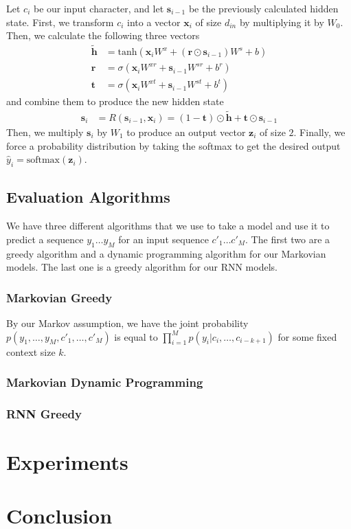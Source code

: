 \documentclass[11pt]{article}
\begin{document}
Let $c_i$ be our input character, and let $\mathbf{s}_{i-1}$ be the previously calculated hidden state. First, we transform $c_i$ into a vector $\mathbf{x}_i$ of size $d_{in}$ by multiplying it by $W_0$. Then, we calculate the following three vectors
\begin{align*}
  \widetilde{\mathbf{h}} &= \text{tanh}(\mathbf{x}_iW^{x} + (\mathbf{r} \odot \mathbf{s}_{i-1})W^s + b) \\
  \mathbf{r} &= \sigma(\mathbf{x}_iW^{xr} + \mathbf{s}_{i-1}W^{sr} + b^r) \\
  \mathbf{t} &= \sigma(\mathbf{x}_iW^{xt} + \mathbf{s}_{i-1}W^{st} + b^t)
\end{align*}
and combine them to produce the new hidden state
\begin{align*}
  \mathbf{s}_i &= R(\mathbf{s}_{i-1}, \mathbf{x}_i) = (1 - \mathbf{t}) \odot \widetilde{\mathbf{h}} + \mathbf{t} \odot \mathbf{s}_{i-1}
\end{align*}
Then, we multiply $\mathbf{s}_i$ by $W_1$ to produce an output vector $\mathbf{z}_i$ of size $2$. Finally, we force a probability distribution by taking the softmax to get the desired output $\hat{y}_i = \text{softmax}(\mathbf{z}_i)$. 
\subsection{Evaluation Algorithms}

We have three different algorithms that we use to take a model and use it to predict a sequence $y_1\dots y_M$ for an input sequence $c'_1\dots c'_M$. The first two are a greedy algorithm and a dynamic programming algorithm for our Markovian models. The last one is a greedy algorithm for our RNN models. 

\subsubsection{Markovian Greedy}

By our Markov assumption, we have the joint probability $p(y_1, \dots, y_M, c'_1, \dots, c'_M)$ is equal to $\prod_{i=1}^M p(y_i | c_i, \dots, c_{i-k+1})$ for some fixed context size $k$. 

\subsubsection{Markovian Dynamic Programming}

\subsubsection{RNN Greedy}

\section{Experiments}

\section{Conclusion}



\end{document}
